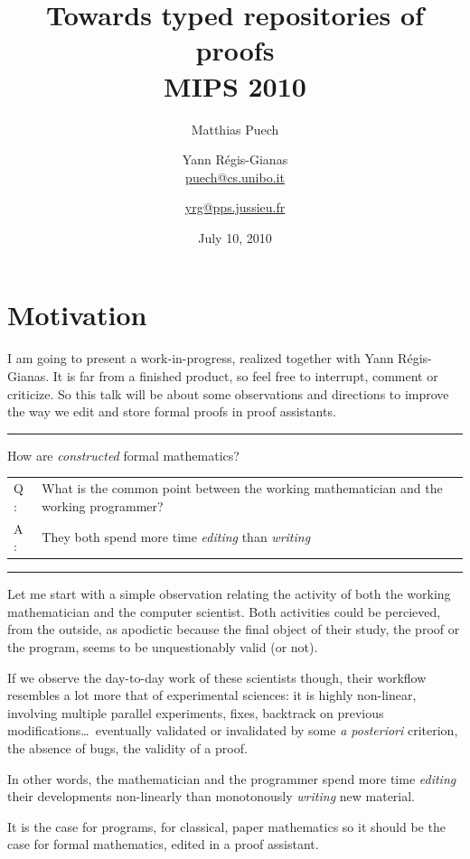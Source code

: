 \documentclass[ignorenonframetext,red]{beamer}
\title{Towards typed repositories of proofs \\[0.6em] 
  \small \textsf{MIPS 2010}}
\date{July 10, 2010}
\author[Matthias Puech \& Yann Régis-Gianas] {
Matthias Puech\inst{1} \and Yann Régis-Gianas\inst{2} \\
{\small \url{puech@cs.unibo.it}} \and {\small \url{yrg@pps.jussieu.fr}}
}
\institute {
  \inst 1 {\small Dept. of Computer Science, University of Bologna} \and
  \inst 2 {\small University Paris 7, CNRS, and INRIA, PPS, team ${\pi}r^2$}
}
\begin{document}
\begin{frame}
  \titlepage
\end{frame}

\section{Motivation}

I am going to present a work-in-progress, realized together with Yann
Régis-Gianas. It is far from a finished product, so feel free to
interrupt, comment or criticize. So this talk will be about some
observations and directions to improve the way we edit and store
formal proofs in proof assistants.

\hrule
\begin{frame}{How are \emph{constructed} formal mathematics?}
  \large
  \begin{tabular}{ll}
    {\Huge Q :} & \parbox{0.8\textwidth}{What is the common point between the working
      mathematician and the working programmer?} \\[2em]
    \pause
    {\Huge A :} & They both spend more time \emph{editing} than \emph{writing}
  \end{tabular}
\end{frame}
\hrule

Let me start with a simple observation relating the activity of both
the working mathematician and the computer scientist. Both activities
could be percieved, from the outside, as apodictic because the final
object of their study, the proof or the program, seems to be
unquestionably valid (or not).

If we observe the day-to-day work of these scientists though, their
workflow resembles a lot more that of experimental sciences: it is
highly non-linear, involving multiple parallel experiments, fixes,
backtrack on previous modifications\ldots\ eventually validated or
invalidated by some \emph{a posteriori} criterion, the absence of
bugs, the validity of a proof.

In other words, the mathematician and the programmer spend more time
\emph{editing} their developments non-linearly than monotonously
\emph{writing} new material.

It is the case for programs, for classical, paper mathematics so it
should be the case for formal mathematics, edited in a proof
assistant.
\end{document}
